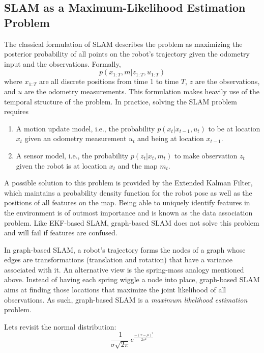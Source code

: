 \documentclass[paper=6.14in:9.21in,pagesize=pdftex,11pt,twoside,openright]{scrbook}
\begin{document}
\subsection{SLAM as a Maximum-Likelihood Estimation Problem}
The classical formulation of SLAM describes the problem as maximizing the posterior probability of all points on the robot's trajectory given the odometry input and the observations. Formally,
\begin{equation}
p(x_{1:T},m|z_{1:T},u_{1:T})
\end{equation}
where $ x_{1:T}$ are all discrete positions from time 1 to time $ T$, $ z$ are the observations, and $ u$ are the odometry measurements. This formulation makes heavily use of the temporal structure of the problem. In practice, solving the SLAM problem requires
\begin{enumerate}
\item A motion update model, i.e., the probability $ p(x_t|x_{t-1},u_t)$ to be at location $ x_t$ given an odometry measurement $ u_t$ and being at location $ x_{t-1}$.
\item  A sensor model, i.e., the probability $ p(z_t|x_t,m_t)$ to make observation $ z_t$ given the robot is at location $ x_t$ and the map $ m_t$.
\end{enumerate}
A possible solution to this problem is provided by the Extended Kalman Filter, which maintains a probability density function for the robot pose as well as the positions of all features on the map. Being able to uniquely identify features in the environment is of outmost importance and is known as the data association problem. Like EKF-based SLAM, graph-based SLAM does not solve this problem and will fail if features are confused.

In graph-based SLAM, a robot's trajectory forms the nodes of a graph whose edges are transformations (translation and rotation) that have a variance associated with it. An alternative view is the spring-mass analogy mentioned above. Instead of having each spring wiggle a node into place, graph-based SLAM aims at finding those locations that maximize the joint likelihood of all observations. As such, graph-based SLAM is a \emph{maximum likelihood estimation} problem.

Lets revisit the normal distribution:
\begin{equation}
\frac{1}{\sigma\sqrt{2\pi}}e^{\frac{-(x-\mu)^2}{2\sigma^2}}
\end{equation}
\end{document}
